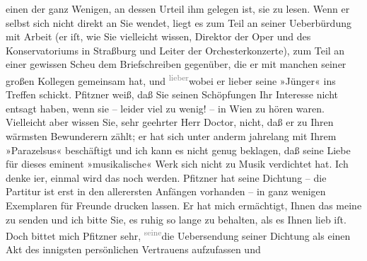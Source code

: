 \begin{ledgroupsized}[t]{13cm}
               einen der ganz Wenigen, an dessen Urteil ihm gelegen ist, sie zu lesen.\pend
           \pstart
           Wenn er selbst sich nicht direkt an Sie wendet, liegt es zum Teil an seiner
               Ueberbürdung mit Arbeit (er iſt, wie Sie vielleicht wissen, Direktor der Oper und des Konservatoriums in Straßburg und Leiter
               der Orchesterkonzerte), zum Teil an einer
               gewissen Scheu dem Briefschreiben gegenüber, die er mit {\pb}manchen seiner großen Kollegen gemeinsam hat, und \substVorne{}\textsuperscript{\textcolor{gray}{lieber}}{\allowbreak}\substDazwischen{}wobei\substHinten{} er lieber seine »Jünger« ins Treffen schickt.\pend
           \pstart
           Pfitzner weiß, daß Sie seinen Schöpfungen Ihr
               Interesse nicht entsagt haben, wenn sie – leider viel zu wenig! – in Wien zu hören waren. Vielleicht aber wissen Sie, sehr geehrter
               Herr Doctor, nicht, daß er zu Ihren wärmsten Bewunderern zählt; er hat sich unter
               anderm jahrelang mit Ihrem »Parazelsus«
               beschäftigt und ich kann es nicht genug beklagen, daß seine Liebe für dieses eminent
               »musikalische« Werk sich nicht zu Musik verdichtet hat. Ich denke i{\geminationm}er, einmal wird das noch werden.\pend
           \pstart
           Pfitzner hat seine Dichtung – die Partitur ist erst in den
               allerersten Anfängen vorhanden – in ganz wenigen Exemplaren für Freunde drucken
               lassen. Er hat mich ermächtigt, Ihnen das meine zu senden und ich bitte Sie, es ruhig
               so lange zu behalten, als es Ihnen lieb iſt. Doch bittet mich Pfitzner sehr, \substVorne{}\textsuperscript{\textcolor{gray}{seine}}\substDazwischen{}die Ueber\substHinten{}sendung seiner Dichtung als einen Akt des innigsten persönlichen Vertrauens aufzufassen und

\end{ledgroupsized}
